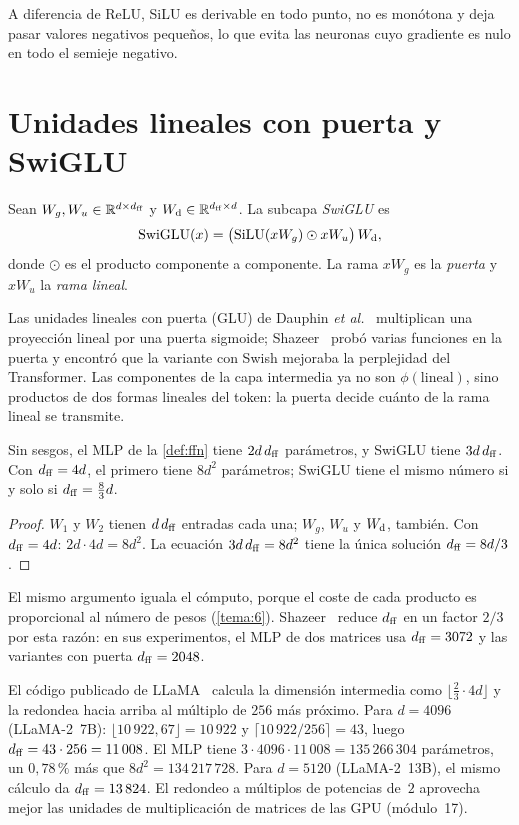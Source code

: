 A diferencia de ReLU, SiLU es derivable en todo punto, no es monótona y deja pasar valores negativos pequeños, lo que evita las neuronas cuyo gradiente es nulo en todo el semieje negativo.

\section{Unidades lineales con puerta y SwiGLU}

\begin{definicion}[SwiGLU]\label{def:swiglu}
Sean $W_g,W_u\in\mathbb{R}^{d\times d_{\mathrm{ff}}}$ y $W_{\mathrm{d}}\in\mathbb{R}^{d_{\mathrm{ff}}\times d}$. La subcapa \emph{SwiGLU} es
\[
\operatorname{SwiGLU}(x)=\bigl(\operatorname{SiLU}(xW_g)\odot xW_u\bigr)\,W_{\mathrm{d}},
\]
donde $\odot$ es el producto componente a componente. La rama $xW_g$ es la \emph{puerta} y $xW_u$ la \emph{rama lineal}.
\end{definicion}

Las unidades lineales con puerta (GLU) de Dauphin \emph{et al.}~\cite{dauphin} multiplican una proyección lineal por una puerta sigmoide; Shazeer~\cite[§2]{shazeer} probó varias funciones en la puerta y encontró que la variante con Swish mejoraba la perplejidad del Transformer. Las componentes de la capa intermedia ya no son $\phi(\text{lineal})$, sino productos de dos formas lineales del token: la puerta decide cuánto de la rama lineal se transmite.

\begin{proposicion}\label{prop:presupuesto}
Sin sesgos, el MLP de la \cref{def:ffn} tiene $2d\,d_{\mathrm{ff}}$ parámetros, y SwiGLU tiene $3d\,d_{\mathrm{ff}}$. Con $d_{\mathrm{ff}}=4d$, el primero tiene $8d^{2}$ parámetros; SwiGLU tiene el mismo número si y solo si $d_{\mathrm{ff}}=\frac83 d$.
\end{proposicion}

\begin{proof}
$W_1$ y $W_2$ tienen $d\,d_{\mathrm{ff}}$ entradas cada una; $W_g$, $W_u$ y $W_{\mathrm{d}}$, también. Con $d_{\mathrm{ff}}=4d$: $2d\cdot 4d=8d^{2}$. La ecuación $3d\,d_{\mathrm{ff}}=8d^{2}$ tiene la única solución $d_{\mathrm{ff}}=8d/3$.
\end{proof}

El mismo argumento iguala el cómputo, porque el coste de cada producto es proporcional al número de pesos (\cref{tema:6}). Shazeer~\cite[§2]{shazeer} reduce $d_{\mathrm{ff}}$ en un factor $2/3$ por esta razón: en sus experimentos, el MLP de dos matrices usa $d_{\mathrm{ff}}=3072$ y las variantes con puerta $d_{\mathrm{ff}}=2048$.

\begin{ejemplo}[LLaMA]\label{ej:llama-dff}
El código publicado de LLaMA~\cite{llamacode} calcula la dimensión intermedia como $\lfloor\frac23\cdot 4d\rfloor$ y la redondea hacia arriba al múltiplo de $256$ más próximo. Para $d=4096$ (LLaMA-2~7B): $\lfloor 10\,922{,}67\rfloor=10\,922$ y $\lceil 10\,922/256\rceil=43$, luego $d_{\mathrm{ff}}=43\cdot 256=11\,008$. El MLP tiene $3\cdot 4096\cdot 11\,008=135\,266\,304$ parámetros, un $0{,}78\,\%$ más que $8d^{2}=134\,217\,728$. Para $d=5120$ (LLaMA-2~13B), el mismo cálculo da $d_{\mathrm{ff}}=13\,824$. El redondeo a múltiplos de potencias de~$2$ aprovecha mejor las unidades de multiplicación de matrices de las GPU (módulo~17).
\end{ejemplo}

